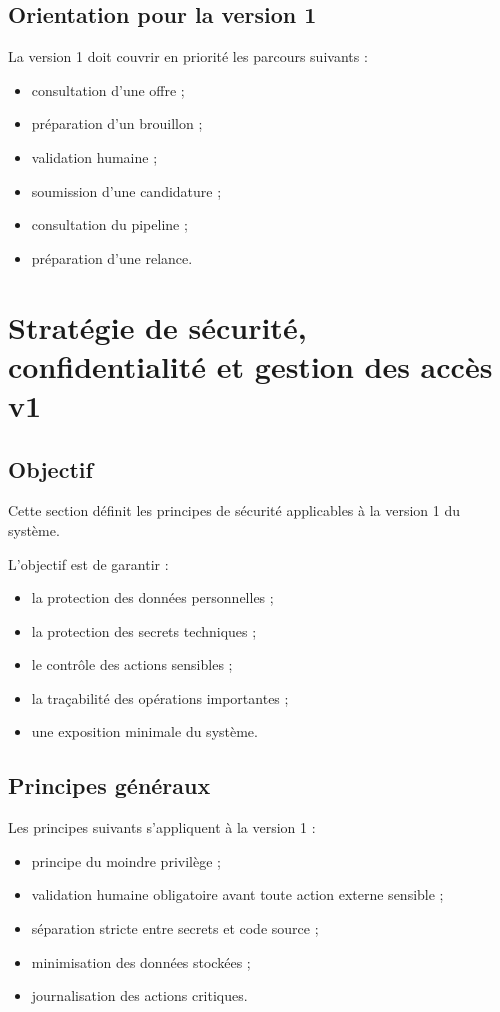 \documentclass[11pt,a4paper]{article}
\begin{document}
\subsection{Orientation pour la version 1}

La version 1 doit couvrir en priorité les parcours suivants :

\begin{itemize}
    \item consultation d’une offre ;
    \item préparation d’un brouillon ;
    \item validation humaine ;
    \item soumission d’une candidature ;
    \item consultation du pipeline ;
    \item préparation d’une relance.
\end{itemize}
\section{Stratégie de sécurité, confidentialité et gestion des accès v1}

\subsection{Objectif}

Cette section définit les principes de sécurité applicables à la version 1 du système.

L’objectif est de garantir :

\begin{itemize}
    \item la protection des données personnelles ;
    \item la protection des secrets techniques ;
    \item le contrôle des actions sensibles ;
    \item la traçabilité des opérations importantes ;
    \item une exposition minimale du système.
\end{itemize}

\subsection{Principes généraux}

Les principes suivants s’appliquent à la version 1 :

\begin{itemize}
    \item principe du moindre privilège ;
    \item validation humaine obligatoire avant toute action externe sensible ;
    \item séparation stricte entre secrets et code source ;
    \item minimisation des données stockées ;
    \item journalisation des actions critiques.
\end{itemize}
\end{document}
